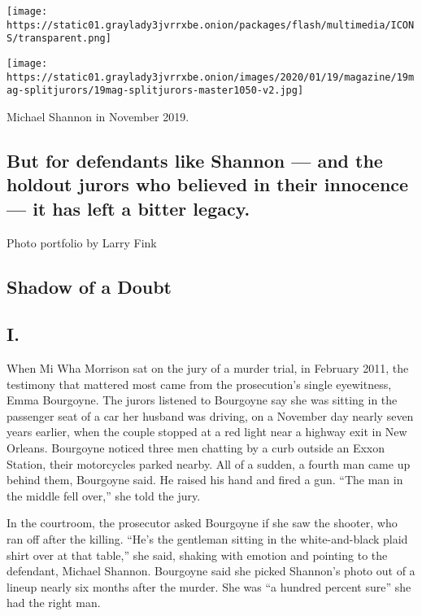 \texttt{[image: https://static01.graylady3jvrrxbe.onion/packages/flash/multimedia/ICONS/transparent.png]}

\texttt{[image: https://static01.graylady3jvrrxbe.onion/images/2020/01/19/magazine/19mag-splitjurors/19mag-splitjurors-master1050-v2.jpg]}

Michael Shannon in November 2019.

\hypertarget{but-for-defendants-like-shannon--and-the-holdout-jurors-who-believed-in-their-innocence--it-has-left-a-bitter-legacy}{%
\subsection{But for defendants like Shannon --- and the holdout jurors
who believed in their innocence --- it has left a bitter
legacy.}\label{but-for-defendants-like-shannon--and-the-holdout-jurors-who-believed-in-their-innocence--it-has-left-a-bitter-legacy}}

Photo portfolio by Larry Fink

\hypertarget{shadow-of-a-doubt}{%
\subsection{Shadow of a Doubt}\label{shadow-of-a-doubt}}

\hypertarget{i}{%
\subsection{I.}\label{i}}

When Mi Wha Morrison sat on the jury of a murder trial, in February
2011, the testimony that mattered most came from the prosecution's
single eyewitness, Emma Bourgoyne. The jurors listened to Bourgoyne say
she was sitting in the passenger seat of a car her husband was driving,
on a November day nearly seven years earlier, when the couple stopped at
a red light near a highway exit in New Orleans. Bourgoyne noticed three
men chatting by a curb outside an Exxon Station, their motorcycles
parked nearby. All of a sudden, a fourth man came up behind them,
Bourgoyne said. He raised his hand and fired a gun. ``The man in the
middle fell over,'' she told the jury.

In the courtroom, the prosecutor asked Bourgoyne if she saw the shooter,
who ran off after the killing. ``He's the gentleman sitting in the
white-and-black plaid shirt over at that table,'' she said, shaking with
emotion and pointing to the defendant, Michael Shannon. Bourgoyne said
she picked Shannon's photo out of a lineup nearly six months after the
murder. She was ``a hundred percent sure'' she had the right man.

